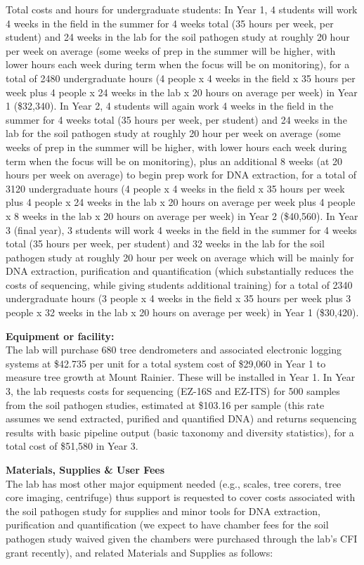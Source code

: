 \documentclass[12pt,oneside]{article}
\begin{document}
Total costs and hours for undergraduate students: In Year 1, 4 students will work 4 weeks in the field in the summer for 4 weeks total (35 hours per week, per student) and 24 weeks in the lab for the soil pathogen study at roughly 20 hour per week on average (some weeks of prep in the summer will be higher, with lower hours each week during term when the focus will be on monitoring), for a total of 2480 undergraduate hours (4 people x 4 weeks in the field x 35 hours per week plus 4 people x 24 weeks in the lab x 20 hours on average per week) in Year 1 (\$32,340). In Year 2, 4 students will again work 4 weeks in the field in the summer for 4 weeks total (35 hours per week, per student) and 24 weeks in the lab for the soil pathogen study at roughly 20 hour per week on average (some weeks of prep in the summer will be higher, with lower hours each week during term when the focus will be on monitoring), plus an additional 8 weeks (at 20 hours per week on average) to begin prep work for DNA extraction, for a total of 3120 undergraduate hours (4 people x 4 weeks in the field x 35 hours per week plus 4 people x 24 weeks in the lab x 20 hours on average per week plus 4 people x 8 weeks in the lab x 20 hours on average per week) in Year 2 (\$40,560). In Year 3 (final year), 3 students will work 4 weeks in the field in the summer for 4 weeks total (35 hours per week, per student) and 32 weeks in the lab for the soil pathogen study at roughly 20 hour per week on average which will be mainly for DNA extraction, purification and quantification (which substantially reduces the costs of sequencing, while giving students additional training) for a total of 2340 undergraduate hours (3 people x 4 weeks in the field x 35 hours per week plus 3 people x 32 weeks in the lab x 20 hours on average per week) in Year 1 (\$30,420). 

{\bf Equipment or facility:}\\
The lab will purchase 680 tree dendrometers and associated electronic logging systems at \$42.735 per unit for a total system cost of \$29,060 in Year 1 to measure tree growth at Mount Rainier. These will be installed in Year 1. In Year 3, the lab requests costs for sequencing (EZ-16S and EZ-ITS) for 500 samples from the soil pathogen studies, estimated at \$103.16 per sample (this rate assumes we send extracted, purified and quantified DNA) and returns sequencing results with basic pipeline output (basic taxonomy and diversity statistics), for a total cost of \$51,580 in Year 3.  

{\bf Materials, Supplies \& User Fees}\\
The lab has most other major equipment needed (e.g., scales, tree corers, tree core imaging, centrifuge) thus support is requested to cover costs associated with the soil pathogen study for supplies and minor tools for DNA extraction, purification and quantification (we expect to have chamber fees for the soil pathogen study waived given the chambers were purchased through the lab's CFI grant recently), and related Materials and Supplies as follows:
\end{document}
